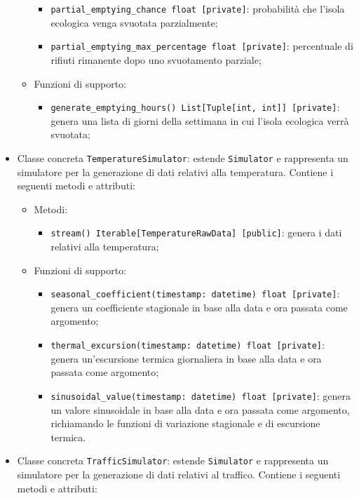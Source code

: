 \begin{itemize}
\begin{itemize}
\begin{itemize}
			            \item \texttt{partial\_emptying\_chance float [private]}: probabilità che l'isola ecologica venga svuotata parzialmente;
			            \item \texttt{partial\_emptying\_max\_percentage float [private]}: percentuale di rifiuti rimanente dopo uno svuotamento parziale;
		            \end{itemize}
		      \item Funzioni di supporto:
		            \begin{itemize}
			            \item \texttt{generate\_emptying\_hours() List[Tuple[int, int]] [private]}: genera una lista di giorni della settimana in cui l'isola ecologica verrà svuotata;
		            \end{itemize}
	      \end{itemize}
	\item Classe concreta \texttt{TemperatureSimulator}: estende \texttt{Simulator} e rappresenta un simulatore per la generazione di dati relativi alla temperatura. Contiene i seguenti metodi e attributi:
	      \begin{itemize}
		      \item Metodi:
		            \begin{itemize}
			            \item \texttt{stream() Iterable[TemperatureRawData] [public]}: genera i dati relativi alla temperatura;
		            \end{itemize}
		      \item Funzioni di supporto:
		            \begin{itemize}
			            \item \texttt{seasonal\_coefficient(timestamp: datetime) float [private]}: genera un coefficiente stagionale in base alla data e ora passata come argomento;
			            \item \texttt{thermal\_excursion(timestamp: datetime) float [private]}: genera un'escursione termica giornaliera in base alla data e ora passata come argomento;
			            \item \texttt{sinusoidal\_value(timestamp: datetime) float [private]}: genera un valore sinusoidale in base alla data e ora passata come argomento, richiamando le funzioni di variazione stagionale e di escursione termica.
		            \end{itemize}
	      \end{itemize}
	\item Classe concreta \texttt{TrafficSimulator}: estende \texttt{Simulator} e rappresenta un simulatore per la generazione di dati relativi al traffico. Contiene i seguenti metodi e attributi:

\end{itemize}
